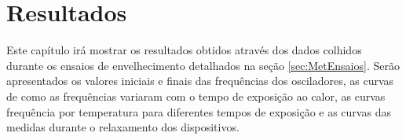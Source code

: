\chapter{Resultados}
\label{sec:Resultados}

Este capítulo irá mostrar os resultados obtidos através dos dados colhidos durante os ensaios de envelhecimento detalhados na seção \ref{sec:MetEnsaios}. Serão apresentados os valores iniciais e finais das frequências dos osciladores, as curvas de como as frequências variaram com o tempo de exposição ao calor, as curvas frequência por temperatura para diferentes tempos de exposição e as curvas das medidas durante o relaxamento dos dispositivos.












